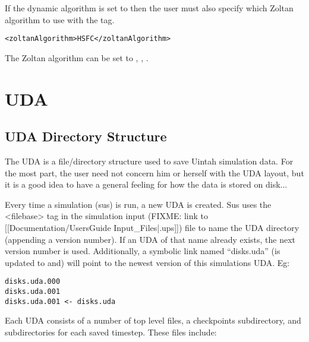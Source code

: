 If the dynamic algorithm is set to  then the user must also specify which
Zoltan algorithm to use with the  tag.  

\begin{Verbatim}[fontsize=\footnotesize]
       <zoltanAlgorithm>HSFC</zoltanAlgorithm>
\end{Verbatim}

The Zoltan algorithm can be set to , , .

\section{UDA}

\subsection{UDA Directory Structure}

The UDA is a file/directory structure used to save Uintah simulation
data.  For the most part, the user need not concern him or herself
with the UDA layout, but it is a good idea to have a general feeling
for how the data is stored on disk...


Every time a simulation (sus) is run, a new UDA is created.  Sus uses
the <filebase> tag in the simulation input
(FIXME: link to [[Documentation/UsersGuide Input\_Files|.ups]]) file to name the UDA
directory (appending a version number).  If an UDA of that name
already exists, the next version number is used.  Additionally, a
symbolic link named ``disks.uda'' (is updated to and) will point to
the newest version of this simulations UDA.  Eg:

\begin{Verbatim}[fontsize=\footnotesize]
disks.uda.000
disks.uda.001
disks.uda.001 <- disks.uda
\end{Verbatim}


Each UDA consists of a number of top level files, a checkpoints
subdirectory, and subdirectories for each saved timestep.  These files
include:

